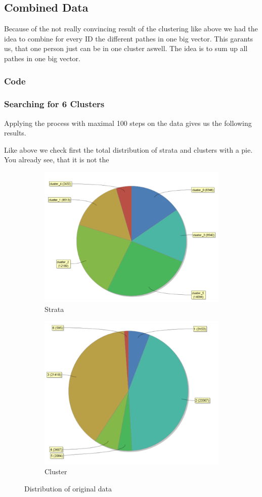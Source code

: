 \subsection{Combined Data}

Because of the not really convincing result of the clustering like above we had the idea to combine for every ID the different pathes in one big vector. This garants us, that one person just can be in one cluster aswell. The idea is to sum up all pathes in one big vector.
\subsubsection{Code}
\subsubsection{Searching for 6 Clusters}
Applying the process with maximal 100 steps on the data gives us the following results.

Like above we check first the total distribution of strata and clusters with a pie. You already see, that it is not the 
\begin{figure}[h]
\centering
\begin{subfigure}{.5\textwidth}
  \centering
  \includegraphics[width=.4\linewidth]{vectorclusteringcluster.PNG}
  \caption{Strata}
  \label{fig:OrgSt}
\end{subfigure}%
\begin{subfigure}{.5\textwidth}
  \centering
  \includegraphics[width=.4\linewidth]{vectorclusteringstrata.PNG}
  \caption{Cluster}
  \label{fig:OrgCl}
\end{subfigure}
\caption{Distribution of original data}
\label{fig:OrgDist}
\end{figure}

